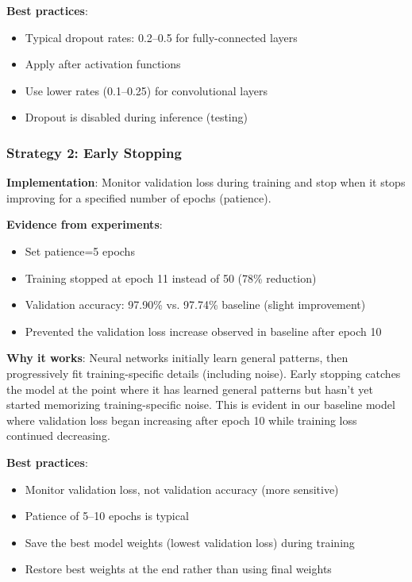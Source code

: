 \textbf{Best practices}:
\begin{itemize}
    \item Typical dropout rates: 0.2--0.5 for fully-connected layers
    \item Apply after activation functions
    \item Use lower rates (0.1--0.25) for convolutional layers
    \item Dropout is disabled during inference (testing)
\end{itemize}

\subsubsection{Strategy 2: Early Stopping}

\textbf{Implementation}: Monitor validation loss during training and stop when it stops improving for a specified number of epochs (patience).

\textbf{Evidence from experiments}:
\begin{itemize}
    \item Set patience=5 epochs
    \item Training stopped at epoch 11 instead of 50 (78\% reduction)
    \item Validation accuracy: 97.90\% vs. 97.74\% baseline (slight improvement)
    \item Prevented the validation loss increase observed in baseline after epoch 10
\end{itemize}

\textbf{Why it works}: Neural networks initially learn general patterns, then progressively fit training-specific details (including noise). Early stopping catches the model at the point where it has learned general patterns but hasn't yet started memorizing training-specific noise. This is evident in our baseline model where validation loss began increasing after epoch 10 while training loss continued decreasing.

\textbf{Best practices}:
\begin{itemize}
    \item Monitor validation loss, not validation accuracy (more sensitive)
    \item Patience of 5--10 epochs is typical
    \item Save the best model weights (lowest validation loss) during training
    \item Restore best weights at the end rather than using final weights
\end{itemize}

